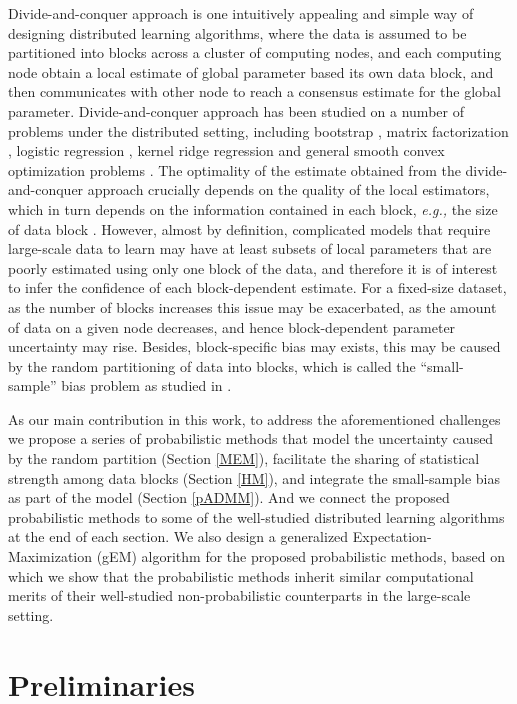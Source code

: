 \documentclass{article}
\newcommand{\eg}[0]{\emph{e.g., }}
\newcommand{\1}[0]{\ensuremath{\boldsymbol{1}}\xspace}
\begin{document}
Divide-and-conquer approach is one intuitively appealing and simple way of designing distributed learning algorithms, where the data is assumed to be partitioned into blocks across a cluster of computing nodes, and each computing node obtain a local estimate of global parameter based its own data block, and then communicates with other node to reach a  consensus estimate for the global parameter. Divide-and-conquer approach has been studied on a number of problems under the distributed setting, including bootstrap \cite{Kleiner2012}, matrix factorization \cite{Mackey2011}, logistic regression \cite{Mann2009}, kernel ridge regression \cite{YZhang2013} and general smooth convex optimization problems \cite{YZhang2012}. The optimality of the estimate obtained from the divide-and-conquer approach crucially depends on the quality of the local estimators, which in turn depends on the information contained in each block, \eg the size of data block \cite{YZhang2012, YZhang2013}.  However, almost by definition, complicated models that require large-scale data to learn may have at least subsets of local parameters that are poorly estimated using only one block of the data, and therefore it is of interest to infer the confidence of each block-dependent estimate. For a fixed-size dataset, as the number of blocks increases this issue may be exacerbated, as the amount of data on a given node decreases, and hence block-dependent parameter uncertainty may rise. Besides, block-specific bias may exists, this may be caused by the random partitioning of data into blocks, which is called the ``small-sample'' bias problem as studied in \cite{YZhang2012, Scott2013}. 

As our main contribution in this work, to address the aforementioned challenges we propose a series of probabilistic methods that model the uncertainty caused by the random partition (Section \ref{MEM}), facilitate the sharing of statistical strength among data blocks (Section \ref{HM}), and integrate the small-sample bias as part of the model (Section \ref{pADMM}). And we connect the proposed probabilistic methods to some of the well-studied distributed learning algorithms at the end of each section. We also design a generalized Expectation-Maximization (gEM) algorithm for the proposed probabilistic methods, based on which we show that the probabilistic methods inherit similar computational merits of their well-studied non-probabilistic counterparts in the large-scale setting.


\section{Preliminaries}
\end{document}
